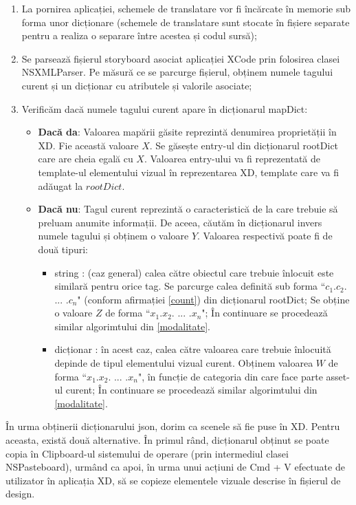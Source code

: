 \begin{enumerate}
\item La pornirea aplicației, schemele de translatare vor fi încărcate în memorie sub forma unor dicționare (schemele de translatare sunt stocate în fișiere separate pentru a realiza o separare între acestea și codul sursă);
\item Se parsează fișierul storyboard asociat aplicației XCode prin folosirea clasei NSXMLParser. Pe măsură ce se parcurge fișierul, obținem numele tagului curent și un dicționar cu atributele și valorile asociate;
\item Verificăm dacă numele tagului curent apare în dicționarul mapDict:
\begin{itemize}
\item \textbf{Dacă da}: Valoarea mapării găsite reprezintă denumirea proprietății în XD. Fie această valoare $X$. Se găsește entry-ul din dicționarul rootDict care are cheia egală cu $X$. Valoarea entry-ului va fi reprezentată de template-ul elementului vizual în reprezentarea XD, template care va fi adăugat la $rootDict$.
\item \textbf{Dacă nu}: Tagul curent reprezintă o caracteristică de la care trebuie să preluam anumite informații. De aceea, căutăm în dicționarul invers numele tagului și obținem o valoare $Y$. Valoarea respectivă poate fi de două tipuri:
\begin{itemize}
\item string : (caz general) calea către obiectul care trebuie înlocuit este similară pentru orice tag. Se parcurge calea definită sub forma ``$c_1$.$c_2$. ... .$c_n$" (conform afirmației \ref{count}) din dicționarul rootDict; Se obține o valoare $Z$ de forma ``$x_1$.$x_2$. ... .$x_n$"; În continuare se procedează similar algorimtului din \ref{modalitate}.
\item dicționar : în acest caz, calea către valoarea care trebuie înlocuită depinde de tipul elementului vizual curent. Obținem valoarea $W$ de forma ``$x_1$.$x_2$. ... .$x_n$", în funcție de categoria din care face parte asset-ul curent; În continuare se procedează similar algorimtului din \ref{modalitate}.
\end{itemize}
\end{itemize}
\end{enumerate}

În urma obținerii dicționarului json, dorim ca scenele să fie puse în XD. Pentru aceasta, există două alternative. În primul rând, dicționarul obținut se poate copia în Clipboard-ul sistemului de operare (prin intermediul clasei NSPasteboard), urmând ca apoi, în urma unui acțiuni de Cmd + V efectuate de utilizator în aplicația XD, să se copieze elementele vizuale descrise în fișierul de design.


